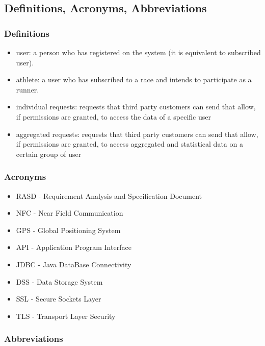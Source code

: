 \subsection{Definitions, Acronyms, Abbreviations}
\subsubsection{Definitions}
\begin{itemize}
\item user: a person who has registered on the system (it is equivalent to subscribed user).
\item athlete: a user who has subscribed to a race and intends to participate as a runner.
\item individual requests: requests that third party customers can send that allow, if permissions are granted, to access the data of a specific user
\item aggregated requests: requests that third party customers can send that allow, if permissions are granted, to access aggregated and statistical data on a certain group of user
\end{itemize}

\subsubsection{Acronyms}
\begin{itemize}
\item RASD - Requirement Analysis and Specification Document
\item NFC - Near Field Communication
\item GPS - Global Positioning System
\item API - Application Program Interface
\item JDBC - Java DataBase Connectivity
\item DSS - Data Storage System
\item SSL - Secure Sockets Layer
\item TLS - Transport Layer Security
\end{itemize}

\subsubsection{Abbreviations}

